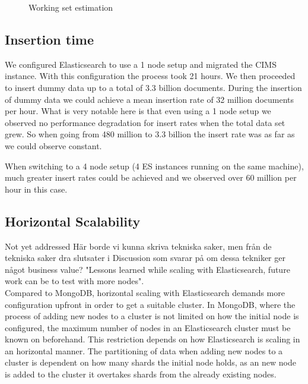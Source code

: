 \begin{figure}[h!]
\centering
{}
\caption{Working set estimation}
\label{fig:ws}
\end{figure}


\subsection{Insertion time}

We configured Elasticsearch to use a 1 node setup and migrated the CIMS instance. With this configuration the process took 21 hours. We then proceeded to insert dummy data up to a total of 3.3 billion documents. During the insertion of dummy data we could achieve a mean insertion rate of 32 million documents per hour. What is very notable here is that even using a 1 node setup we observed no performance degradation for insert rates when the total data set grew. So when going from 480 million to 3.3 billion the insert rate was as far as we could observe constant.

When switching to a 4 node setup (4 ES instances running on the same machine), much greater insert rates could be achieved and we observed over 60 million per hour in this case.




\subsection{Horizontal Scalability}
Not yet addressed
Här borde vi kunna skriva tekniska saker, men från de tekniska saker dra slutsater i Discussion som svarar på om dessa tekniker ger något business value?
"Lessons learned while scaling with Elasticsearch, future work can be to test with more nodes".\\
Compared to MongoDB, horizontal scaling with Elasticsearch demands more configuration upfront in order to get a suitable cluster. 
In MongoDB, where the process of adding new nodes to a cluster is not limited on how the initial node is configured, the maximum number of nodes in an Elasticsearch cluster must be known on beforehand. This restriction depends on how Elasticsearch is scaling in an horizontal manner. The partitioning of data when adding new nodes to a cluster is dependent on how many shards the initial node holds, as an new node is added to the cluster it overtakes shards from the already existing nodes.


